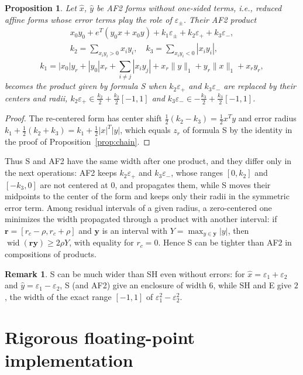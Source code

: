 \documentclass[10pt]{article}
\newtheorem{propo}{Proposition}
\theoremstyle{definition}
\newtheorem{remark}{Remark}
\newcommand{\eps}{\varepsilon}
\newcommand{\wid}{\operatorname{wid}}
\begin{document}
\begin{propo}
\label{prop:af2}
Let $\hat x$, $\hat y$ be AF2 forms without one-sided terms, i.e., reduced affine forms whose error terms play the role of $\eps_\pm$. Their AF2 product~\cite{messine2002extentions}
\[
\begin{gathered}x_0y_0 + e^T(y_0x+x_0y) + k_1\eps_\pm + k_2\eps_+ + k_3\eps_-,\\ k_2=\sum_{x_iy_i>0}x_iy_i,\quad k_3=\sum_{x_iy_i<0}|x_iy_i|,\end{gathered}
\]
\[
k_1 = |x_0|y_r+|y_0|x_r+\sum_{i\ne j}|x_iy_j| + x_r\|y\|_1+y_r\|x\|_1+x_ry_r,
\]
becomes the product given by formula S when $k_2\eps_+$ and $k_3\eps_-$ are replaced by their centers and radii, $k_2\eps_+\in \tfrac{k_2}{2}+\tfrac{k_2}{2}[-1,1]$ and $k_3\eps_-\in-\tfrac{k_3}{2}+\tfrac{k_3}{2}[-1,1]$.
\end{propo}
\begin{proof}
The re-centered form has center shift $\tfrac12(k_2-k_3)=\tfrac12x^Ty$ and error radius $k_1+\tfrac12(k_2+k_3) = k_1+\tfrac12|x|^T|y|$, which equals $z_r$ of formula S by the identity in the proof of Proposition~\ref{prop:chain}.
\end{proof}

Thus S and AF2 have the same width after one product, and they differ only in the next operations: AF2 keeps $k_2\eps_+$ and $k_3\eps_-$, whose ranges $[0,k_2]$ and $[-k_3,0]$ are not centered at $0$, and propagates them, while S moves their midpoints to the center of the form and keeps only their radii in the symmetric error term. Among residual intervals of a given radius, a zero-centered one minimizes the width propagated through a product with another interval: if $\mathbf r=[r_c-\rho,r_c+\rho]$ and $\mathbf y$ is an interval with $Y=\max_{y\in\mathbf y}|y|$, then $\wid(\mathbf r\mathbf y)\ge 2\rho Y$, with equality for $r_c=0$. Hence S can be tighter than AF2 in compositions of products.

\begin{remark}
S can be much wider than SH even without errors: for $\hat x=\eps_1+\eps_2$ and $\hat y=\eps_1-\eps_2$, S (and AF2) give an enclosure of width $6$, while SH and E give $2$, the width of the exact range $[-1,1]$ of $\eps_1^2-\eps_2^2$.
\end{remark}

\section{Rigorous floating-point implementation}
\label{sec:rigor}
\end{document}
